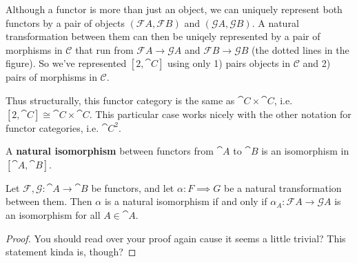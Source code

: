 \documentclass[twoside,10pt]{report}
\begin{document}
Although a functor is more than just an object, we can uniquely represent both functors by a pair of objects $(\mathcal{F}A, \mathcal{F}B)$ and $(\mathcal{G}A, \mathcal{G}B)$. A natural transformation between them can then be uniqely represented by a pair of morphisms in $\mathcal{C}$ that run from $\mathcal{F}A\to \mathcal{G}A$ and $\mathcal{F}B\to \mathcal{G}B$ (the dotted lines in the figure). So we've represented $[2, \cat{C}]$ using only 1) pairs objects in $\mathcal{C}$ and 2) pairs of morphisms in $\mathcal{C}$.

Thus structurally, this functor category is the same as $\cat{C} \times \cat{C}$, i.e. $[2, \cat{C}] \cong \cat{C} \times \cat{C}$. This particular case works nicely with the other notation for functor categories, i.e. $\cat{C}^2$.

\begin{defn}
	A \textbf{natural isomorphism} between functors from $\cat{A}$ to $\cat{B}$ is an isomorphism in $[\cat{A},\cat{B}].$
\end{defn}

\begin{prop}
Let $\mathcal{F},\mathcal{G}:\cat{A}\to \cat{B}$ be functors, and let $\alpha:F\implies G$ be a natural transformation between them. Then $\alpha$ is a natural isomorphism if and only if $\alpha_A:\mathcal{F}A\to \mathcal{G}A$ is an isomorphism for all $A \in \cat{A}$.
\end{prop}
\begin{proof}
{\color{red}You should read over your proof again cause it seems a little trivial? This statement kinda is, though?}
\end{proof}
\end{document}
